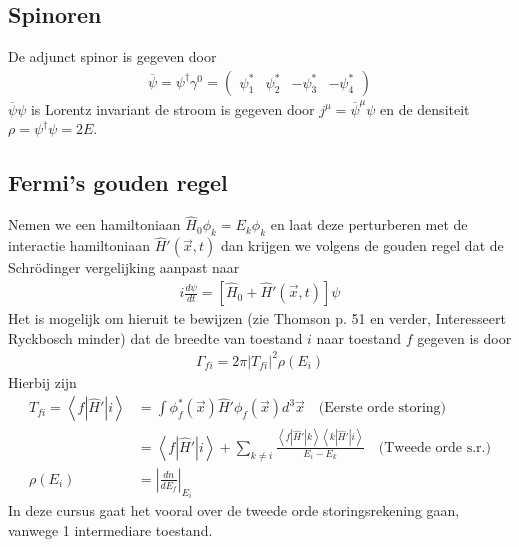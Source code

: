 \documentclass[../main.tex]{subfiles}
\begin{document}
\subsection{Spinoren}%
\label{sub:spinoren}

De adjunct spinor is gegeven door
\begin{equation}
    \begin{aligned}
        \label{eq:adj_dirac_spinor}
        \overline \psi = \psi^\dagger\gamma^0 =
        \begin{pmatrix}
            \psi_1^* & \psi_2^* & -\psi_3^* & -\psi_4^*
        \end{pmatrix}
    \end{aligned}
\end{equation}
$\overline \psi \psi$ is Lorentz invariant de stroom is gegeven door $j^\mu = \overline \psi ^\mu \psi$ en de densiteit $\rho = \psi^\dagger\psi = 2E$.

\subsection{Fermi's gouden regel}%
\label{sub:fermi_s_gouden_regel}

Nemen we een hamiltoniaan $\hat{H}_0\phi_k=E_k\phi_k$ en laat deze perturberen met de interactie hamiltoniaan $\hat{H}'(\vec{x},t)$ dan krijgen we volgens de gouden regel dat de Schrödinger vergelijking aanpast naar
\begin{equation}
    \begin{aligned}
        \label{eq:fermi_pert}
        i \frac{d\psi}{dt} = [\hat{H}_0 + \hat{H}'(\vec{x},t)]\psi
    \end{aligned}
\end{equation}
Het is mogelijk om hieruit te bewijzen (zie Thomson p. 51 en verder, Interesseert Ryckbosch minder) dat de breedte van toestand $i$ naar toestand $f$ gegeven is door
\begin{equation}
    \begin{aligned}
        \label{eq:fermi_gouden_regel}
        \Gamma_{fi}=2\pi|T_{fi}|^2\rho(E_i)
    \end{aligned}
\end{equation}
Hierbij zijn
\begin{equation}
    \begin{aligned}
        \label{eq:fermi_par}
        T_{fi}=\left<f|\hat{H}'|i\right> &= \int \phi_f^*(\vec{x})\hat{H}'\phi_f(\vec{x})d^3\vec{x}\quad \text{(Eerste orde storing)}\\
                                         &= \left<f|\hat{H}'|i\right> + \sum_{k\neq i} \frac{\left<f|\hat{H}'|k\right>\left<k|\hat{H}'|i\right>}{E_i-E_k}\quad \text{(Tweede orde s.r.)}\\
        \rho(E_i)&=\left| \frac{dn}{dE_f} \right|_{E_i}
    \end{aligned}
\end{equation}
In deze cursus gaat het vooral over de tweede orde storingsrekening gaan, vanwege 1 intermediare toestand.
\end{document}
